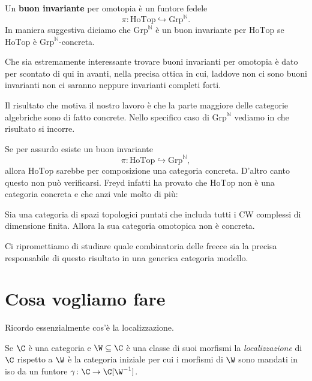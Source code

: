 \documentclass[10pt,a4paper]{amsart}
\begin{document}
\begin{definition} Un \textbf{buon invariante} per omotopia è un funtore fedele $$\pi : \text{HoTop} \hookrightarrow \text{Grp}^\mathbb{N}.$$ In maniera suggestiva diciamo che $\text{Grp}^\mathbb{N}$ è un buon invariante per $\text{HoTop}$ se $\text{HoTop}$ è $\text{Grp}^\mathbb{N}$-concreta.
\end{definition}

Che sia estremamente interessante trovare buoni invarianti per omotopia è dato per scontato di qui in avanti, nella precisa ottica in cui, laddove non ci sono buoni invarianti non ci saranno neppure invarianti completi forti.

Il risultato che motiva il nostro lavoro è che la parte maggiore delle categorie algebriche sono di fatto concrete.
Nello specifico caso di $\text{Grp}^\mathbb{N}$ vediamo in che risultato si incorre.\newline

Se per assurdo esiste un buon invariante $$\pi : \text{HoTop} \hookrightarrow \text{Grp}^\mathbb{N},$$ allora $\text{HoTop}$ sarebbe per composizione una categoria concreta. D'altro canto questo non può verificarsi. Freyd infatti ha provato che $\text{HoTop}$ non è una categoria concreta e che anzi vale molto di più:

\begin{theorem}[Freyd]
Sia  una categoria di spazi topologici puntati che includa tutti i CW complessi di dimensione finita. Allora la sua categoria omotopica non è concreta.
\end{theorem}

Ci ripromettiamo di studiare quale combinatoria delle frecce sia la precisa responsabile di questo risultato in una generica categoria modello.


\section{Cosa vogliamo fare}
Ricordo essenzialmente cos'è la localizzazione.

Se $\C$ è una categoria e $\W\subseteq \C$ è una classe di suoi morfismi la \emph{localizzazione} di $\C$ rispetto a $\W$ è la categoria iniziale per cui i morfismi di $\W$ sono mandati in iso da un funtore $\gamma \colon \C \to \C[\W^{-1}]$.
\end{document}
